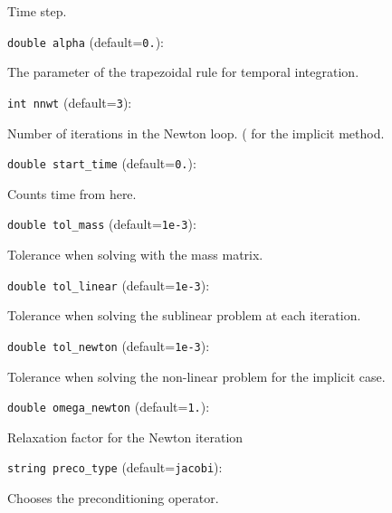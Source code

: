 Time step. 

\item\verb+double alpha+ {\rm(default=\verb|0.|)}:

The parameter of the trapezoidal rule
for temporal integration. 

\item\verb+int nnwt+ {\rm(default=\verb|3|)}:

Number of iterations in the Newton loop. (
for the implicit method. 

\item\verb+double start_time+ {\rm(default=\verb|0.|)}:

Counts time from here.

\item\verb+double tol_mass+ {\rm(default=\verb|1e-3|)}:

Tolerance when solving with the mass matrix. 

\item\verb+double tol_linear+ {\rm(default=\verb|1e-3|)}:

Tolerance when solving the sublinear problem
at each iteration.

\item\verb+double tol_newton+ {\rm(default=\verb|1e-3|)}:

Tolerance when solving the non-linear problem
for the implicit case.

\item\verb+double omega_newton+ {\rm(default=\verb|1.|)}:

Relaxation factor for the Newton iteration

\item\verb+string preco_type+ {\rm(default=\verb|jacobi|)}:

Chooses the preconditioning operator. 

